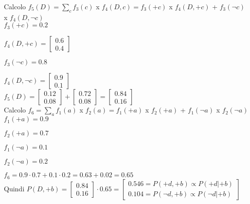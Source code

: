 Calcolo $f_5 (D) = \sum_c f_3 (c)$ x $f_4 (D, c) = f_3 (+c)$ x $f_4 (D, +c)$ +
$f_3 (\neg c)$ x $f_4 (D, \neg c)$\\

$f_3 (+c) = 0.2$

$f_4 (D, +c) =
\begin{bmatrix}
0.6 \\
0.4
\end{bmatrix}$

$f_3 (\neg c) = 0.8$

$f_4 (D, \neg c) =
\begin{bmatrix}
0.9 \\
0.1
\end{bmatrix}$\\

$f_5 (D) =
\begin{bmatrix}
0.12 \\
0.08
\end{bmatrix} + 
\begin{bmatrix}
0.72 \\
0.08
\end{bmatrix} =
\begin{bmatrix}
0.84 \\
0.16
\end{bmatrix}$
\\

Calcolo $f_6 = \sum_a f_1 (a)$ x $f_2 (a) = f_1 (+a)$ x $f_2 (+a)$ +
$f_1 (\neg a)$ x $f_2 (\neg a)$\\

$f_1 (+a) = 0.9$

$f_2 (+a) = 0.7$

$f_1 (\neg a) = 0.1$

$f_2 (\neg a) = 0.2$

$f_6 = 0.9\cdot 0.7 + 0.1\cdot 0.2 = 0.63 + 0.02 = 0.65$\\

Quindi $P(D, +b) = 
\begin{bmatrix}
0.84 \\
0.16
\end{bmatrix}
\cdot 0.65 =
\begin{bmatrix}
0.546 = P(+d, +b) \propto P(+d|+b) \\
0.104 = P(\neg d, +b) \propto P(\neg d|+b)
\end{bmatrix}$
